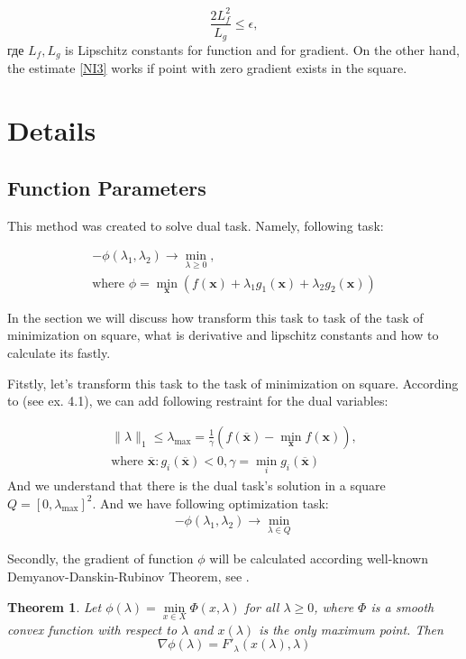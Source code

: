 \documentclass[12pt]{article}
\newtheorem{theorem}{Theorem}[section]
\begin{document}
$$\frac{2L_f^2}{L_g}\leq \epsilon,$$
где $L_f, L_g$ is Lipschitz constants for function and for gradient. On the other hand, the estimate \ref{NI3} works if point with zero gradient exists in the square. 

\section{Details}
\label{details}
\subsection{Function Parameters}

This method was created to solve dual task. Namely, following task:

\begin{gather}
-\phi(\lambda_1, \lambda_2) \rightarrow \min_{\lambda\geq 0},\\
\text{where } \phi = \min_\textbf{x}\left(f(\textbf{x}) + \lambda_1 g_1(\textbf{x}) + \lambda_2 g_2(\textbf{x})\right)
\end{gather}

In the section we will discuss how transform this task to task of the task of minimization on square, what is derivative and lipschitz constants and how to calculate its fastly.

Fitstly, let's transform this task to the task of minimization on square. According to \cite{task} (see ex. 4.1), we can add following restraint for the dual variables:

\begin{gather}
\label{restr:dual}
\|{\lambda}\|_1 \leq \lambda_{\text{max}} = \frac{1}{\gamma}\left(f(\overline{\textbf{x}}) -\min\limits_{\textbf{x}}f(\textbf{x})\right),\\
\text{where $\overline{\textbf{x}}:g_i(\overline{\textbf{x}})<0,\gamma = \min\limits_ig_i(\overline{\textbf{x}})$}
\end{gather}
And we understand that there is the dual task's solution in a square $Q = [0, \lambda_{\text{max}}]^2$. And we have following optimization task:
\begin{gather}
\label{dual}
-\phi(\lambda_1, \lambda_2) \rightarrow \min_{\lambda \in Q}
\end{gather}

Secondly, the gradient of function $\phi$ will be calculated according well-known Demyanov-Danskin-Rubinov Theorem, see \cite{DDR-theorem}.

\begin{theorem}
Let $\phi(\lambda)=\min\limits_{x\in X}\Phi(x,\lambda)$ for all $\lambda\geq0$, where $\Phi$ is a smooth convex function with respect to $\lambda$ and $x(\lambda)$ is the only maximum point. Then
$$\nabla \phi(\lambda) = F'_\lambda\left(x(\lambda),\lambda\right)$$
\end{theorem}
\end{document}
